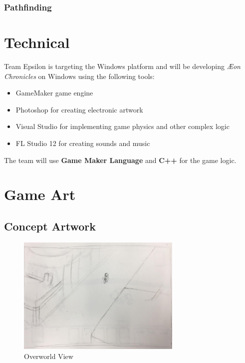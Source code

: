 \documentclass[12pt,titlepage]{article}
\newcommand\gametitle{\textit{\AE on Chronicles}\xspace}
\begin{document}
\subsubsection{Pathfinding}

\newpage
\section{Technical}
%

Team Epsilon is targeting the Windows platform and will be developing \gametitle
on Windows using the following tools:

\begin{itemize}
    \item GameMaker game engine
    \item Photoshop for creating electronic artwork
    \item Visual Studio for implementing game physics and other complex logic
    \item FL Studio 12 for creating sounds and music
\end{itemize}

The team will use \textbf{Game Maker Language} and \textbf{C++} for the game
logic.

\newpage
\section{Game Art}
%

\subsection{Concept Artwork}
\begin{figure}[H]
    \caption{Overworld View}
    \label{fig:overview}
    \centering
    \includegraphics[width=0.7\textwidth]{../../graphics/overview}
\end{figure}
\end{document}
